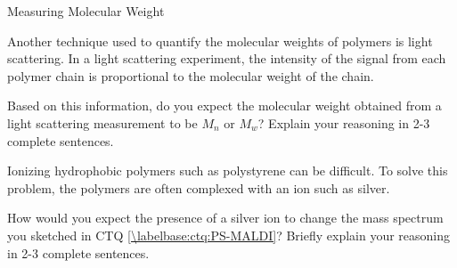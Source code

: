 \begin{activity}{Measuring Molecular Weight}
\begin{exercises}

	
	\exercise Another technique used to quantify the molecular weights of polymers is light scattering.  In a light scattering experiment, the intensity of the signal from each polymer chain is proportional to the molecular weight of the chain.
	
		Based on this information, do you expect the molecular weight obtained from a light scattering measurement to be $M_n$ or $M_w$?  Explain your reasoning in 2-3 complete sentences.
		
	
	\exercise Ionizing hydrophobic polymers such as polystyrene can be difficult.  To solve this problem, the polymers are often complexed with an ion such as silver.
	
		How would you expect the presence of a silver ion to change the mass spectrum you sketched in CTQ \ref{\labelbase:ctq:PS-MALDI}?  Briefly explain your reasoning in 2-3 complete sentences.
	
\end{exercises}


	
\end{activity}